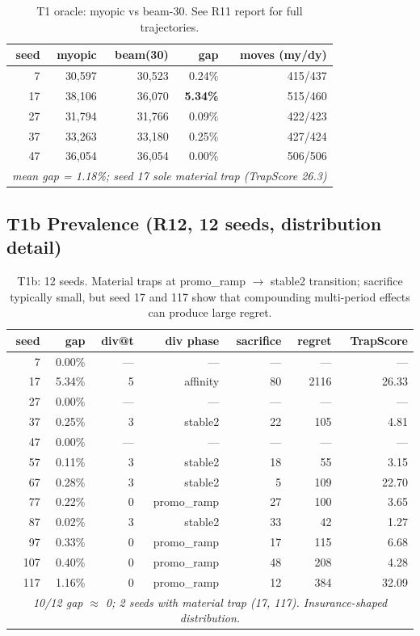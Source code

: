 \documentclass[11pt,a4paper]{article}
\begin{document}
\begin{table}[H]
\centering
\small
\begin{tabular}{r r r r r}
\toprule
seed & myopic & beam(30) & gap & moves (my/dy) \\
\midrule
7  & 30,597 & 30,523 & 0.24\% & 415/437 \\
17 & 38,106 & 36,070 & \textbf{5.34\%} & 515/460 \\
27 & 31,794 & 31,766 & 0.09\% & 422/423 \\
37 & 33,263 & 33,180 & 0.25\% & 427/424 \\
47 & 36,054 & 36,054 & 0.00\% & 506/506 \\
\midrule
\multicolumn{5}{c}{\emph{mean gap = 1.18\%; seed 17 sole material trap (TrapScore 26.3)}} \\
\bottomrule
\end{tabular}
\caption{T1 oracle: myopic vs beam-30. See R11 report for full
trajectories. \label{tab:r11}}
\end{table}

\subsection{T1b Prevalence (R12, 12 seeds, distribution detail)}

\begin{table}[H]
\centering
\scriptsize
\begin{tabular}{rrrrrr r}
\toprule
seed & gap & div@t & div phase & sacrifice & regret & TrapScore \\
\midrule
7   & 0.00\% & ---   & ---       & ---   & ---   & ---   \\
17  & 5.34\% & 5     & affinity  & 80    & 2116  & 26.33 \\
27  & 0.00\% & ---   & ---       & ---   & ---   & ---   \\
37  & 0.25\% & 3     & stable2   & 22    & 105   & 4.81  \\
47  & 0.00\% & ---   & ---       & ---   & ---   & ---   \\
57  & 0.11\% & 3     & stable2   & 18    & 55    & 3.15  \\
67  & 0.28\% & 3     & stable2   & 5     & 109   & 22.70 \\
77  & 0.22\% & 0     & promo\_ramp & 27  & 100   & 3.65  \\
87  & 0.02\% & 3     & stable2   & 33    & 42    & 1.27  \\
97  & 0.33\% & 0     & promo\_ramp & 17  & 115   & 6.68  \\
107 & 0.40\% & 0     & promo\_ramp & 48  & 208   & 4.28  \\
117 & 1.16\% & 0     & promo\_ramp & 12  & 384   & 32.09 \\
\midrule
\multicolumn{7}{c}{\emph{10/12 gap $\approx$ 0; 2 seeds with material trap (17, 117).
Insurance-shaped distribution.}} \\
\bottomrule
\end{tabular}
\caption{T1b: 12 seeds. Material traps at promo\_ramp $\to$ stable2
transition; sacrifice typically small, but seed 17 and 117 show that
compounding multi-period effects can produce large regret. \label{tab:r12}}
\end{table}
\end{document}
